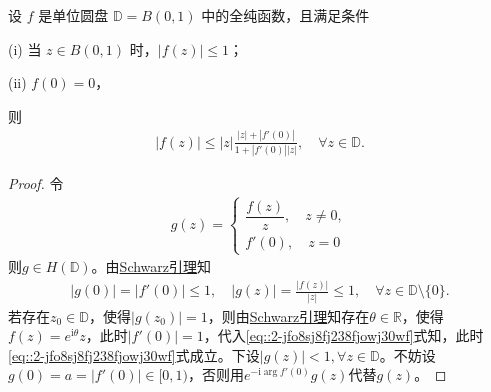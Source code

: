 \documentclass[../../main.tex]{subfiles}%
\begin{document}
\begin{corollary}[更精确的Schwarz引理]\label{theorem:更精确的Schwarz引理}
设 \( f \) 是单位圆盘 \(\mathbb{D} = B(0,1) \) 中的全纯函数，且满足条件

(i) 当 \( z \in B(0,1) \) 时，\( |f(z)| \leqslant  1 \)；

(ii) \( f(0) = 0 \)，

则
\begin{align}\label{eq::2-jfo8sj8fj238fjowj30wf}
\left| f\left( z \right) \right|\leqslant \left| z \right|\frac{\left| z \right|+\left| f' \left( 0 \right) \right|}{1+\left| f'\left( 0 \right) \right|\left| z \right|},\quad \forall z\in \mathbb{D}.
\end{align}
\end{corollary}
\begin{proof}
令
\begin{align*}
g(z)=
\begin{cases}
\dfrac{f(z)}{z},\quad z\neq 0,\\
f'(0),\quad z=0
\end{cases}
\end{align*}
则$g\in H(\mathbb{D})$。由\hyperref[theorem:Schwarz引理-定理4.5.3]{Schwarz引理}知
\begin{align*}
|g(0)|=|f'(0)|\leqslant 1,\quad |g(z)|=\frac{|f(z)|}{|z|}\leqslant 1,\quad \forall z\in\mathbb{D}\setminus\{0\}.
\end{align*}
若存在$z_0\in\mathbb{D}$，使得$|g(z_0)|=1$，则由\hyperref[theorem:Schwarz引理-定理4.5.3]{Schwarz引理}知存在$\theta\in\mathbb{R}$，使得$f(z)=e^{\mathrm{i}\theta}z$，此时$|f'(0)|=1$，代入\eqref{eq::2-jfo8sj8fj238fjowj30wf}式知，此时\eqref{eq::2-jfo8sj8fj238fjowj30wf}式成立。下设$|g(z)|<1,\forall z\in\mathbb{D}$。不妨设$g(0)=a=|f'(0)|\in[0,1)$，否则用$e^{-\mathrm{i}\arg f'(0)}g(z)$代替$g(z)$。


\end{proof}
\end{document}
